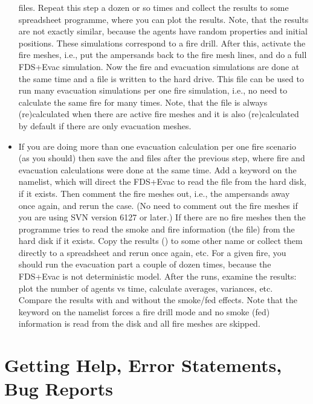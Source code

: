 \documentclass[12pt,a4paper,final,twoside]{stylevk}
\begin{document}
\begin{itemize}
  files.  Repeat this step a dozen or so times and collect the results
  to some spreadsheet programme, where you can plot the results.
  Note, that the results are not exactly similar, because the agents
  have random properties and initial positions.  These simulations
  correspond to a fire drill.  After this, activate the fire meshes,
  i.e., put the ampersands back to the fire mesh lines, and do
  a full FDS+Evac simulation.  Now the fire and evacuation simulations
  are done at the same time and a file  is
  written to the hard drive.  This file can be used to run many
  evacuation simulations per one fire simulation, i.e., no need
  to calculate the same fire for many times.  Note, that the
   file is always (re)calculated when there are
  active fire meshes and it is also (re)calculated by default if there
  are only evacuation meshes.  
%
\item If you are doing more than one evacuation calculation per one
  fire scenario (as you should) then save the 
  and  files after the previous step, where fire
  and evacuation calculations were done at the same time.  Add a
  keyword  on the 
  namelist, which will direct the FDS+Evac to read the
   file from the hard disk, if it exists.  Then
  comment the fire meshes out, i.e., the ampersands away once
  again, and rerun the case.  (No need to comment out the fire meshes
  if you are using SVN version 6127 or later.)  If there are no fire
  meshes then the programme tries to read the smoke and fire
  information (the  file) from the hard disk if
  it exists.  Copy the results () to some other
  name or collect them directly to a spreadsheet and rerun once again,
  etc.  For a given fire, you should run the evacuation part a
  couple of dozen times, because the FDS+Evac is not deterministic
  model.  After the runs, examine the results: plot the number of
  agents vs time, calculate averages, variances, etc.  Compare
  the results with and without the smoke/fed effects.  Note that the
  keyword  on the  namelist
  forces a fire drill mode and no smoke (fed) information is read from
  the disk and all fire meshes are skipped.
%
\end{itemize}


\section{Getting Help, Error Statements, Bug
  Reports}\label{Sec_ErrorsBugs} 
\end{document}
